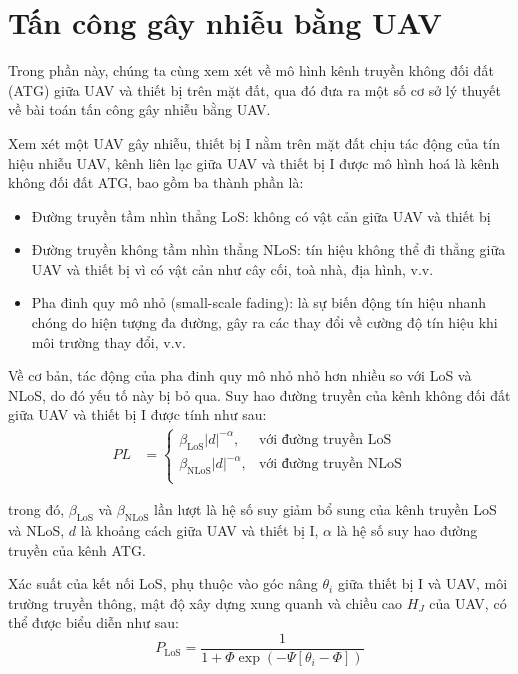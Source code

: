 \documentclass{uetgraduation}
\begin{document}
\section{Tấn công gây nhiễu bằng UAV}
Trong phần này, chúng ta cùng xem xét về mô hình kênh truyền không đối đất (ATG) giữa UAV và thiết bị trên mặt đất, qua đó đưa ra một số cơ sở lý thuyết về bài toán tấn công gây
nhiễu bằng UAV.

Xem xét một UAV gây nhiễu, thiết bị I nằm trên mặt đất chịu tác động của tín hiệu nhiễu UAV, kênh liên lạc giữa UAV và thiết bị I được mô 
hình hoá là kênh không đối đất ATG, bao gồm ba thành phần là:
\begin{itemize}
    \item Đường truyền tầm nhìn thẳng LoS: không có vật cản giữa UAV và thiết bị
    \item Đường truyền không tầm nhìn thẳng NLoS: tín hiệu không thể đi thẳng giữa UAV và thiết bị vì có vật cản như cây cối, toà nhà, địa hình, v.v. 
    \item Pha đinh quy mô nhỏ (small-scale fading): là sự biến động tín hiệu nhanh chóng do hiện tượng đa đường, gây ra các thay đổi về cường độ tín hiệu khi môi trường
    thay đổi, v.v.
\end{itemize}

Về cơ bản, tác động của pha đinh quy mô nhỏ nhỏ hơn nhiều so với LoS và NLoS, do đó yếu tố này bị bỏ qua. Suy hao đường truyền của kênh không đối đất giữa UAV và thiết
bị I được tính như sau:
\begin{align}
    PL &= \begin{cases}
        \beta_\text{LoS}|d|^{-\alpha}, & \text{với đường truyền LoS} \\
        \beta_\text{NLoS}|d|^{-\alpha}, & \text{với đường truyền NLoS} \\
    \end{cases}
    \label{eq:pathloss}
\end{align}

trong đó, $\beta_\text{LoS}$ và $\beta_\text{NLoS}$ lần lượt là hệ số suy giảm bổ sung của kênh truyền LoS và NLoS, $d$ là khoảng cách giữa UAV và thiết bị I,
$\alpha$ là hệ số suy hao đường truyền của kênh ATG.

Xác suất của kết nối LoS, phụ thuộc vào góc nâng $\theta_i$ giữa thiết bị I và UAV, môi trường truyền thông, mật độ xây dựng xung quanh và chiều cao $H_J$ của UAV,
có thể được biểu diễn như sau:
\begin{equation}
    P_\text{LoS} = \frac{1}{1 + \Phi \exp(-\Psi [\theta_i - \Phi])}
    \label{eq:plos}
\end{equation}
\end{document}
